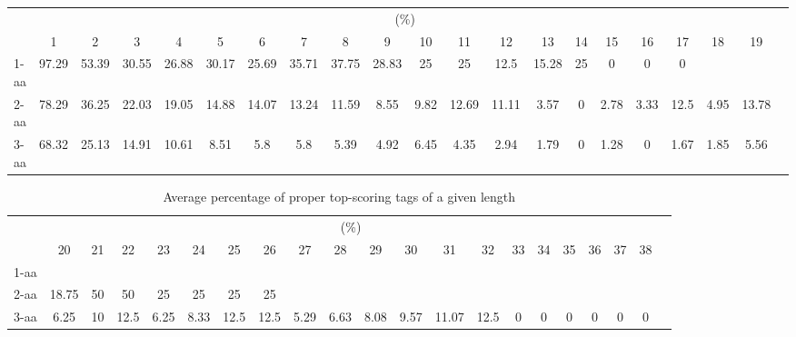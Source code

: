 \documentclass{article}
\begin{document}
\begin{table}[h]\tiny
\vspace{3mm}
{\centering
\begin{center}
\begin{tabular}{|l|c|c|c|c|c|c|c|c|c|c|c|c|c|c|c|c|c|c|c|c|}
  \hline
  & \multicolumn{ 19 }{|c|}{(\%)} \\
  \cline{2- 20}
    & 1 & 2 & 3 & 4 & 5 & 6 & 7 & 8 & 9 & 10 & 11 & 12 & 13 & 14 & 15 & 16 & 17 & 18 & 19\\
  \hline
1-aa  & 97.29 & 53.39 & 30.55 & 26.88 & 30.17 & 25.69 & 35.71 & 37.75 & 28.83 & 25 & 25 & 12.5 & 15.28 & 25 & 0 & 0 & 0 &  & \\
2-aa  & 78.29 & 36.25 & 22.03 & 19.05 & 14.88 & 14.07 & 13.24 & 11.59 & 8.55 & 9.82 & 12.69 & 11.11 & 3.57 & 0 & 2.78 & 3.33 & 12.5 & 4.95 & 13.78\\
3-aa  & 68.32 & 25.13 & 14.91 & 10.61 & 8.51 & 5.8 & 5.8 & 5.39 & 4.92 & 6.45 & 4.35 & 2.94 & 1.79 & 0 & 1.28 & 0 & 1.67 & 1.85 & 5.56\\
 \hline
\end{tabular}
\end{center}
\par}
\centering

\vspace{3mm}
\label{table:table10}
\end{table}
\begin{table}[h]\tiny
\vspace{3mm}
{\centering
\begin{center}
\begin{tabular}{|l|c|c|c|c|c|c|c|c|c|c|c|c|c|c|c|c|c|c|c|c|}
  \hline
  & \multicolumn{ 19 }{|c|}{(\%)} \\
  \cline{2- 20}
    & 20 & 21 & 22 & 23 & 24 & 25 & 26 & 27 & 28 & 29 & 30 & 31 & 32 & 33 & 34 & 35 & 36 & 37 & 38\\
  \hline
1-aa  &  &  &  &  &  &  &  &  &  &  &  &  &  &  &  &  &  &  & \\
2-aa  & 18.75 & 50 & 50 & 25 & 25 & 25 & 25 &  &  &  &  &  &  &  &  &  &  &  & \\
3-aa  & 6.25 & 10 & 12.5 & 6.25 & 8.33 & 12.5 & 12.5 & 5.29 & 6.63 & 8.08 & 9.57 & 11.07 & 12.5 & 0 & 0 & 0 & 0 & 0 & 0\\
 \hline
\end{tabular}
\end{center}
\par}
\centering

\caption{ Average percentage of proper top-scoring tags of a given length}

\vspace{3mm}
\label{table:table10}
\end{table}
\end{document}
